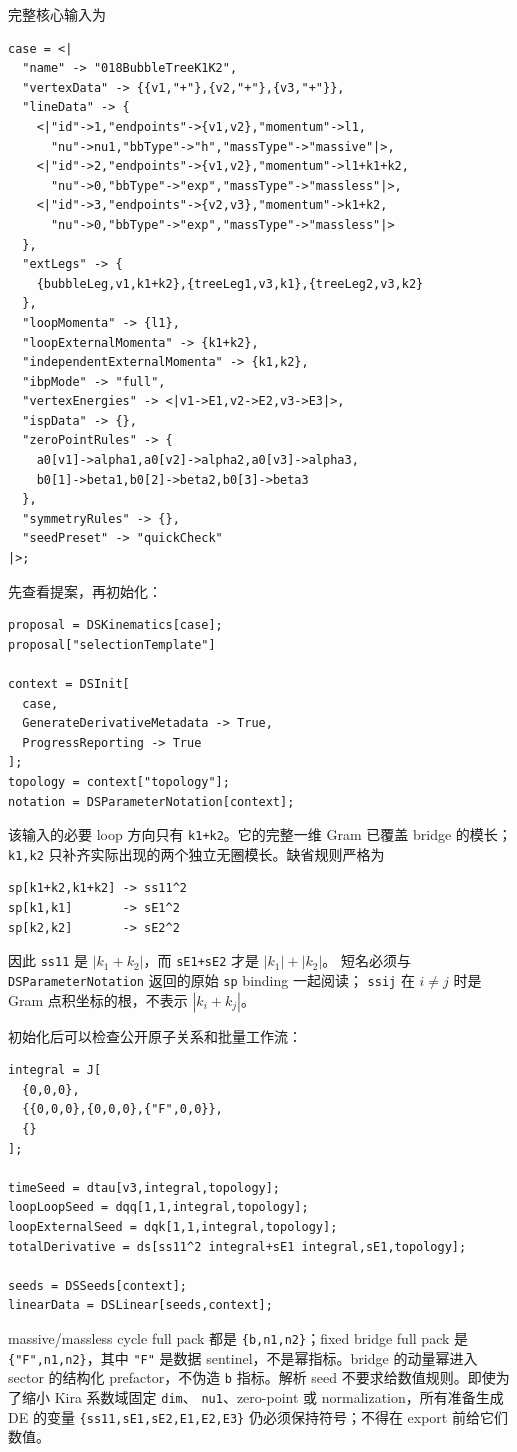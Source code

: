﻿\documentclass[a4paper,11pt]{article}
\begin{document}
完整核心输入为
\begin{verbatim}
case = <|
  "name" -> "018BubbleTreeK1K2",
  "vertexData" -> {{v1,"+"},{v2,"+"},{v3,"+"}},
  "lineData" -> {
    <|"id"->1,"endpoints"->{v1,v2},"momentum"->l1,
      "nu"->nu1,"bbType"->"h","massType"->"massive"|>,
    <|"id"->2,"endpoints"->{v1,v2},"momentum"->l1+k1+k2,
      "nu"->0,"bbType"->"exp","massType"->"massless"|>,
    <|"id"->3,"endpoints"->{v2,v3},"momentum"->k1+k2,
      "nu"->0,"bbType"->"exp","massType"->"massless"|>
  },
  "extLegs" -> {
    {bubbleLeg,v1,k1+k2},{treeLeg1,v3,k1},{treeLeg2,v3,k2}
  },
  "loopMomenta" -> {l1},
  "loopExternalMomenta" -> {k1+k2},
  "independentExternalMomenta" -> {k1,k2},
  "ibpMode" -> "full",
  "vertexEnergies" -> <|v1->E1,v2->E2,v3->E3|>,
  "ispData" -> {},
  "zeroPointRules" -> {
    a0[v1]->alpha1,a0[v2]->alpha2,a0[v3]->alpha3,
    b0[1]->beta1,b0[2]->beta2,b0[3]->beta3
  },
  "symmetryRules" -> {},
  "seedPreset" -> "quickCheck"
|>;
\end{verbatim}

先查看提案，再初始化：
\begin{verbatim}
proposal = DSKinematics[case];
proposal["selectionTemplate"]

context = DSInit[
  case,
  GenerateDerivativeMetadata -> True,
  ProgressReporting -> True
];
topology = context["topology"];
notation = DSParameterNotation[context];
\end{verbatim}
该输入的必要 loop 方向只有 \texttt{k1+k2}。它的完整一维 Gram 已覆盖 bridge 的模长；
\texttt{k1,k2} 只补齐实际出现的两个独立无圈模长。缺省规则严格为
\begin{verbatim}
sp[k1+k2,k1+k2] -> ss11^2
sp[k1,k1]       -> sE1^2
sp[k2,k2]       -> sE2^2
\end{verbatim}
因此 \texttt{ss11} 是 $|k_1+k_2|$，而 \texttt{sE1+sE2} 才是 $|k_1|+|k_2|$。
短名必须与 \texttt{DSParameterNotation} 返回的原始 \texttt{sp} binding 一起阅读；
\texttt{ssij} 在 $i\ne j$ 时是 Gram 点积坐标的根，不表示 $|k_i+k_j|$。

初始化后可以检查公开原子关系和批量工作流：
\begin{verbatim}
integral = J[
  {0,0,0},
  {{0,0,0},{0,0,0},{"F",0,0}},
  {}
];

timeSeed = dtau[v3,integral,topology];
loopLoopSeed = dqq[1,1,integral,topology];
loopExternalSeed = dqk[1,1,integral,topology];
totalDerivative = ds[ss11^2 integral+sE1 integral,sE1,topology];

seeds = DSSeeds[context];
linearData = DSLinear[seeds,context];
\end{verbatim}
massive/massless cycle full pack 都是 \texttt{\{b,n1,n2\}}；fixed bridge full pack 是
\texttt{\{"F",n1,n2\}}，其中 \texttt{"F"} 是数据 sentinel，不是幂指标。bridge 的动量幂进入
sector 的结构化 prefactor，不伪造 \texttt{b} 指标。解析 seed 不要求给数值规则。即使为了缩小 Kira 系数域固定 \texttt{dim}、
\texttt{nu1}、zero-point 或 normalization，所有准备生成 DE 的变量
\texttt{\{ss11,sE1,sE2,E1,E2,E3\}} 仍必须保持符号；不得在 export 前给它们数值。
\end{document}
